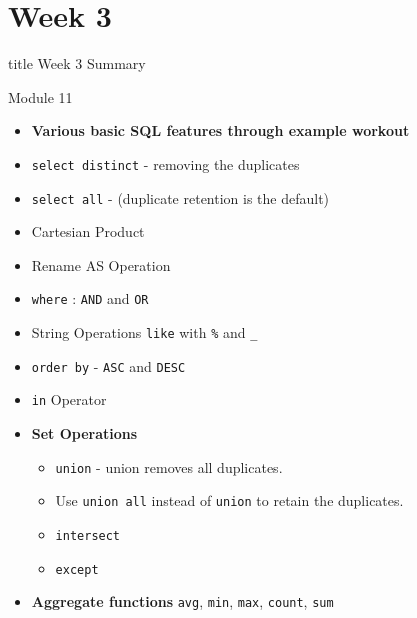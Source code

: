 \documentclass[aspectratio=169, xcolor=dvipsnames]{beamer}
\begin{document}
\section{Week 3}

\begin{frame}
  \vfill
  \centering
  \begin{beamercolorbox}[sep=8pt,center,shadow=true,rounded=true]{title}
    Week 3 Summary\par%
  \end{beamercolorbox}
  \vfill
\end{frame}

\begin{frame}{Module 11}
    \begin{itemize}[<+->]
        \item \textbf{Various basic SQL features through example workout}
        \item \texttt{select distinct} - removing the duplicates
        \item \texttt{select all} - (duplicate retention is the default)
        \item Cartesian Product
        \item Rename AS Operation
        \item \texttt{where} : \texttt{AND} and \texttt{OR}
        \item String Operations \texttt{like} with \texttt{\%} and \texttt{\_}
        \item \texttt{order by} - \texttt{ASC} and \texttt{DESC}
        \item \texttt{in} Operator
        \item \textbf{Set Operations}
        \begin{itemize}
            \item[$\triangleright$] \texttt{union} - union removes all duplicates.
            \item[$\triangleright$] Use \texttt{union all} instead of \texttt{union} to retain the duplicates.
            \item[$\triangleright$] \texttt{intersect}
            \item[$\triangleright$] \texttt{except}
        \end{itemize}
        \item \textbf{Aggregate functions} \texttt{avg}, \texttt{min}, \texttt{max}, \texttt{count}, \texttt{sum}
    \end{itemize}
\end{frame}
\end{document}
